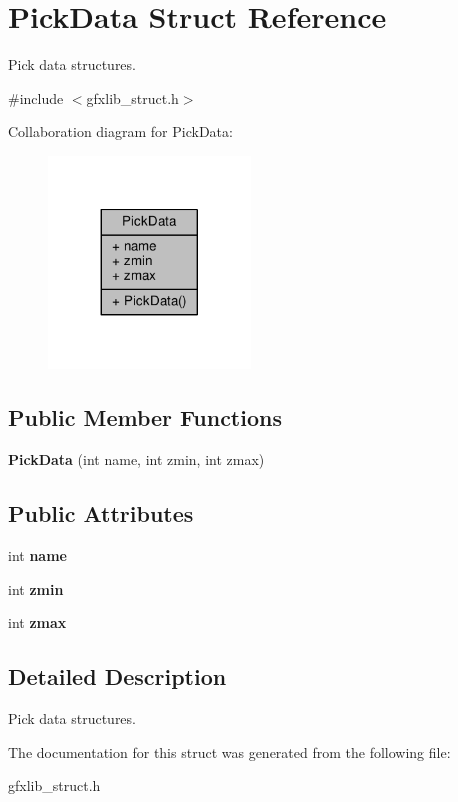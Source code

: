 \hypertarget{structPickData}{}\section{Pick\+Data Struct Reference}
\label{structPickData}


Pick data structures.  




{\ttfamily \#include $<$gfxlib\+\_\+struct.\+h$>$}



Collaboration diagram for Pick\+Data\+:
\nopagebreak
\begin{figure}[H]
\begin{center}
\leavevmode
\includegraphics[width=152pt]{d5/d66/structPickData__coll__graph}
\end{center}
\end{figure}
\subsection*{Public Member Functions}
\begin{DoxyCompactItemize}
\item 
{\bfseries Pick\+Data} (int name, int zmin, int zmax)\hypertarget{structPickData_a691c9c2fafa201fc8c82054cb83017b4}{}\label{structPickData_a691c9c2fafa201fc8c82054cb83017b4}

\end{DoxyCompactItemize}
\subsection*{Public Attributes}
\begin{DoxyCompactItemize}
\item 
int {\bfseries name}\hypertarget{structPickData_a4adefd6bd91ea3c662da03df283ace87}{}\label{structPickData_a4adefd6bd91ea3c662da03df283ace87}

\item 
int {\bfseries zmin}\hypertarget{structPickData_a85f5a8759dc1c407b521b07d0299cff2}{}\label{structPickData_a85f5a8759dc1c407b521b07d0299cff2}

\item 
int {\bfseries zmax}\hypertarget{structPickData_a0354900dbd1398610ab5a4c6784baf4b}{}\label{structPickData_a0354900dbd1398610ab5a4c6784baf4b}

\end{DoxyCompactItemize}


\subsection{Detailed Description}
Pick data structures. 

The documentation for this struct was generated from the following file\+:\begin{DoxyCompactItemize}
\item 
gfxlib\+\_\+struct.\+h\end{DoxyCompactItemize}
